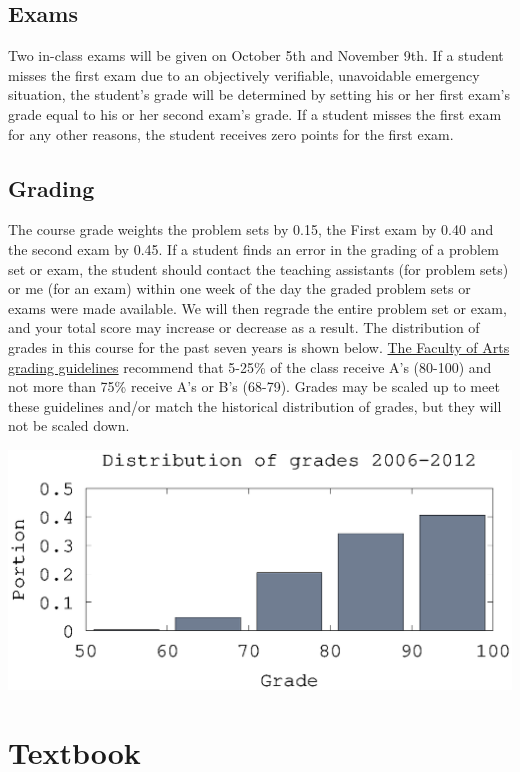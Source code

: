 \documentclass[10pt]{article}
\begin{document}
\subsection{Exams}
Two in-class exams will be given on October 5th and November 9th. If
a student misses the first exam due to an objectively verifiable,
unavoidable emergency situation, the student's grade will be
determined by setting his or her first exam's grade equal to his or her
second exam's grade. If a student misses the first exam for any other
reasons, the student receives zero points for the first exam.

\subsection{Grading}
The course grade weights the problem sets by 0.15, the First exam by
0.40 and the second exam by 0.45. If a student finds an error in the
grading of a problem set or exam, the student should contact the
teaching assistants (for problem sets) or me (for an exam) within one
week of the day the graded problem sets or exams were made
available. We will then regrade the entire problem set or exam, and
your total score may increase or decrease as a result.  The
distribution of grades in this course for the past seven years is shown
below.
\href{http://www.arts.ubc.ca/faculty-amp-staff/resources/courses-and-grading/grading-guidelines.html}
{The Faculty of Arts grading guidelines} recommend that 5-25\% of the
class receive A's (80-100) and not more than 75\% receive A's or B's
(68-79). Grades may be scaled up to meet these guidelines and/or match
the historical distribution of grades, but they will not be scaled
down. 

\begin{centering}
  \includegraphics[width=0.8\linewidth]{526gradeDist}
\end{centering}

\section{Textbook}
\end{document}
